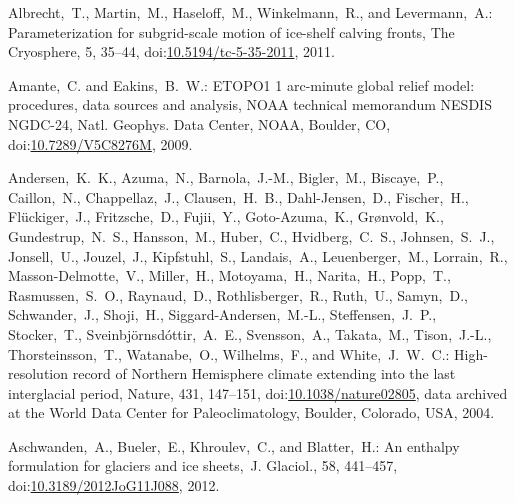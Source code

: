 \documentclass[tc, manuscript]{copernicus}
\begin{document}
\begin{thebibliography}{114}

 Albrecht,~T., Martin,~M., Haseloff,~M., Winkelmann,~R., and Levermann,~A.: Parameterization for subgrid-scale motion of ice-shelf calving fronts, The Cryosphere, 5, 35--44,
doi:\href{http://dx.doi.org/10.5194/tc-5-35-2011}{10.5194/tc-5-35-2011}, 2011.



Amante,~C. and Eakins,~B.~W.: ETOPO1 1 arc-minute global relief model: procedures, data sources and analysis, NOAA technical memorandum NESDIS NGDC-24, Natl. Geophys. Data Center, NOAA, Boulder, CO,
doi:\href{http://dx.doi.org/10.7289/V5C8276M}{10.7289/V5C8276M}, 2009.


Andersen,~K.~K., Azuma,~N., Barnola,~J.-M., Bigler,~M., Biscaye,~P., Caillon,~N., Chappellaz,~J., Clausen,~H.~B., Dahl-Jensen,~D., Fischer,~H., Fl\"uckiger,~J., Fritzsche,~D., Fujii,~Y., Goto-Azuma,~K., Gr{\o}nvold,~K., Gundestrup,~N.~S., Hansson,~M., Huber,~C., Hvidberg,~C.~S., Johnsen,~S.~J., Jonsell,~U., Jouzel,~J., Kipfstuhl,~S., Landais,~A., Leuenberger,~M., Lorrain,~R., Masson-Delmotte,~V., Miller,~H., Motoyama,~H., Narita,~H., Popp,~T., Rasmussen,~S.~O., Raynaud,~D., Rothlisberger,~R., Ruth,~U., Samyn,~D., Schwander,~J., Shoji,~H., Siggard-Andersen,~M.-L., Steffensen,~J.~P., Stocker,~T., Sveinbj\"ornsd\'ottir,~A.~E., Svensson,~A., Takata,~M., Tison,~J.-L., Thorsteinsson,~T., Watanabe,~O., Wilhelms,~F., and White,~J.~W.~C.: High-resolution record of Northern Hemisphere climate extending into the last interglacial period, Nature, 431, 147--151,
doi:\href{http://dx.doi.org/10.1038/nature02805}{10.1038/nature02805}, data archived at the World Data Center for Paleoclimatology, Boulder, Colorado, USA, 2004.


Aschwanden,~A., Bueler,~E., Khroulev,~C., and Blatter,~H.: An enthalpy formulation for glaciers and ice sheets,~J. Glaciol., 58, 441--457,
doi:\href{http://dx.doi.org/10.3189/2012JoG11J088}{10.3189/2012JoG11J088}, 2012.



\end{thebibliography}
\end{document}
